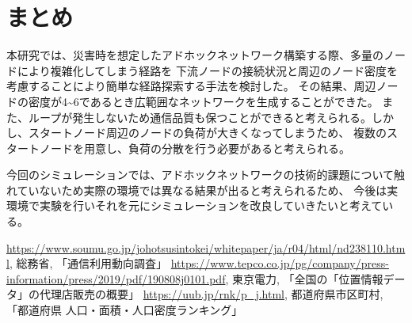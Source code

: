 \documentclass[a4paper, 9pt]{ltjsarticle}
\begin{document}
\section{まとめ}
本研究では、災害時を想定したアドホックネットワーク構築する際、多量のノードにより複雑化してしまう経路を
下流ノードの接続状況と周辺のノード密度を考慮することにより簡単な経路探索する手法を検討した。
その結果、周辺ノードの密度が4\textasciitilde6であるとき広範囲なネットワークを生成することができた。
また、ループが発生しないため通信品質も保つことができると考えられる。しかし、スタートノード周辺のノードの負荷が大きくなってしまうため、
複数のスタートノードを用意し、負荷の分散を行う必要があると考えられる。\par
今回のシミュレーションでは、アドホックネットワークの技術的課題について触れていないため実際の環境では異なる結果が出ると考えられるため、
今後は実環境で実験を行いそれを元にシミュレーションを改良していきたいと考えている。

\begin{thebibliography}{9}
   \url{https://www.soumu.go.jp/johotsusintokei/whitepaper/ja/r04/html/nd238110.html}, 総務省, 「通信利用動向調査」 
   \url{https://www.tepco.co.jp/pg/company/press-information/press/2019/pdf/190808j0101.pdf}, 東京電力, 「全国の「位置情報データ」の代理店販売の概要」
   \url{https://uub.jp/rnk/p\_j.html}, 都道府県市区町村, 「都道府県 人口・面積・人口密度ランキング」
\end{thebibliography}
\end{document}
